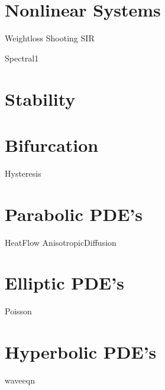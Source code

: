 \documentclass[nociteref]{SIAM-GH-book}
\begin{document}
\part{Nonlinear Systems}
{Weightloss}
{Shooting}
{SIR}



{Spectral1}

\part{Stability}

\part{Bifurcation}
{Hysteresis}

\part{Parabolic PDE's}
{HeatFlow}
{AnisotropicDiffusion}

\part{Elliptic PDE's}
 {Poisson}


\part{Hyperbolic PDE's}
{waveeqn}

% 
% 
% 
% 
% 
% 
\end{document}
